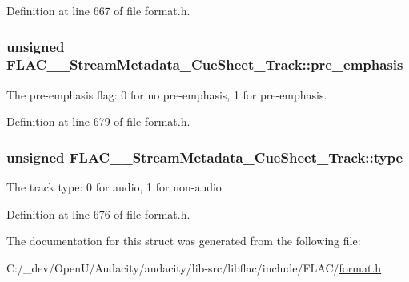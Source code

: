 Definition at line 667 of file format.\+h.

\subsubsection[{\texorpdfstring{pre\+\_\+emphasis}{pre_emphasis}}]{\setlength{\rightskip}{0pt plus 5cm}unsigned F\+L\+A\+C\+\_\+\+\_\+\+Stream\+Metadata\+\_\+\+Cue\+Sheet\+\_\+\+Track\+::pre\+\_\+emphasis}\hypertarget{struct_f_l_a_c_____stream_metadata___cue_sheet___track_ab4a97e43166ee16d1d16cccd901ddc3a}{}\label{struct_f_l_a_c_____stream_metadata___cue_sheet___track_ab4a97e43166ee16d1d16cccd901ddc3a}
The pre-\/emphasis flag\+: 0 for no pre-\/emphasis, 1 for pre-\/emphasis. 

Definition at line 679 of file format.\+h.

\subsubsection[{\texorpdfstring{type}{type}}]{\setlength{\rightskip}{0pt plus 5cm}unsigned F\+L\+A\+C\+\_\+\+\_\+\+Stream\+Metadata\+\_\+\+Cue\+Sheet\+\_\+\+Track\+::type}\hypertarget{struct_f_l_a_c_____stream_metadata___cue_sheet___track_a848575fc7a7292867ce76a9b3705f6e7}{}\label{struct_f_l_a_c_____stream_metadata___cue_sheet___track_a848575fc7a7292867ce76a9b3705f6e7}
The track type\+: 0 for audio, 1 for non-\/audio. 

Definition at line 676 of file format.\+h.



The documentation for this struct was generated from the following file\+:\begin{DoxyCompactItemize}
\item 
C\+:/\+\_\+dev/\+Open\+U/\+Audacity/audacity/lib-\/src/libflac/include/\+F\+L\+A\+C/\hyperlink{include_2_f_l_a_c_2format_8h}{format.\+h}\end{DoxyCompactItemize}
